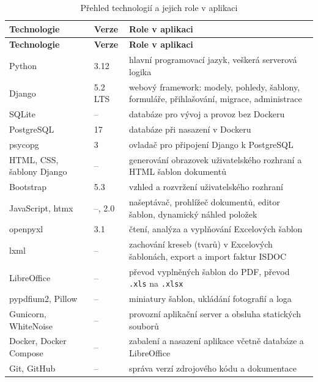 \begin{longtable}{p{}p{}p{}}
\caption{Přehled technologií a jejich role v aplikaci}\label{tab:technologie}\\
\hline
\textbf{Technologie} & \textbf{Verze} & \textbf{Role v aplikaci} \\
\hline
\endfirsthead
\hline
\textbf{Technologie} & \textbf{Verze} & \textbf{Role v aplikaci} \\
\hline
\endhead
\hline
\endfoot
Python & 3.12 & hlavní programovací jazyk, veškerá serverová logika \\
Django & 5.2 LTS & webový framework: modely, pohledy, šablony, formuláře, přihlašování, migrace, administrace \\
SQLite & -- & databáze pro vývoj a provoz bez Dockeru \\
PostgreSQL & 17 & databáze při nasazení v Dockeru \\
psycopg & 3 & ovladač pro připojení Django k PostgreSQL \\
HTML, CSS, šablony Django & -- & generování obrazovek uživatelského rozhraní a HTML šablon dokumentů \\
Bootstrap & 5.3 & vzhled a rozvržení uživatelského rozhraní \\
JavaScript, htmx & --, 2.0 & našeptávač, prohlížeč dokumentů, editor šablon, dynamický náhled položek \\
openpyxl & 3.1 & čtení, analýza a vyplňování Excelových šablon \\
lxml & -- & zachování kreseb (tvarů) v Excelových šablonách, export a import faktur ISDOC \\
LibreOffice & -- & převod vyplněných šablon do PDF, převod \texttt{.xls} na \texttt{.xlsx} \\
pypdfium2, Pillow & -- & miniatury šablon, ukládání fotografií a loga \\
Gunicorn, WhiteNoise & -- & provozní aplikační server a obsluha statických souborů \\
Docker, Docker Compose & -- & zabalení a nasazení aplikace včetně databáze a LibreOffice \\
Git, GitHub & -- & správa verzí zdrojového kódu a dokumentace \\
\end{longtable}
